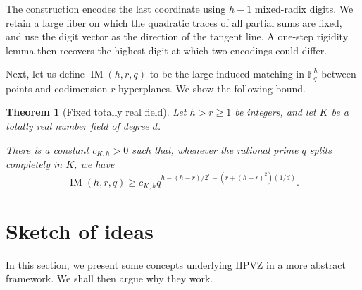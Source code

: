 \documentclass[11pt]{article}
\theoremstyle{plain}
\newtheorem{theorem}{Theorem}[section]
\theoremstyle{remark}
\newcommand{\F}{\mathbb F}
\newcommand{\IM}{\operatorname{IM}}
\begin{document}
The construction encodes the last coordinate using $h-1$ mixed-radix
digits.  We retain a large fiber on which the quadratic traces of all partial
sums are fixed, and use the digit vector as the direction of the tangent
line.  A one-step rigidity lemma then recovers the highest digit at which two
encodings could differ.

Next, let us define $\IM(h,r,q)$ to be the large induced matching in $\F_q^h$ between points and codimension $r$ hyperplanes. We show the following bound.
\begin{theorem}[Fixed totally real field]\label{thm:hyper-field}
Let $h>r \geq 1$ be integers, and let $K$ be a totally real number field of
degree $d$.  

There is a constant $c_{K,h}>0$ such that, whenever the rational prime $q$
splits completely in $K$, we have
\begin{equation}\label{eq:hyper-bound}
  \IM(h,r,q)\geq c_{K,h}q^{h-(h-r)/2^r-(r+(h-r)^2)(1/d)}.
\end{equation}
\end{theorem}

\section{Sketch of ideas}


In this section, we present some concepts underlying HPVZ in a more abstract framework. We shall then argue why they work. 
\end{document}
